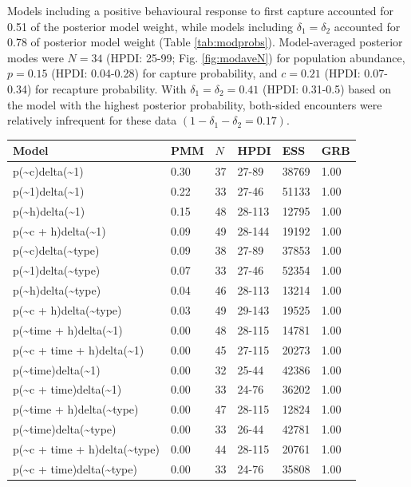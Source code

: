 \documentclass[12pt]{article}
\begin{document}
Models including a positive behavioural response to first capture accounted for 0.51 of the posterior model weight, while models including $\delta_1=\delta_2$ accounted for 0.78 of posterior model weight (Table \ref{tab:modprobs}). Model-averaged posterior modes were $N=34$ (HPDI: 25-99; Fig. \ref{fig:modaveN}) for population abundance, $p=0.15$ (HPDI: 0.04-0.28) for capture probability, and $c=0.21$ (HPDI: 0.07-0.34) for recapture probability. With $\delta_1=\delta_2=0.41$ (HPDI: 0.31-0.5) based on the model with the highest posterior probability, both-sided encounters were relatively infrequent for these data $(1-\delta_1-\delta_2=0.17)$.
\begin{table}[ht]
\centering
\begin{tabular}{llllll}
  \hline
Model & PMM & $N$ & HPDI & ESS & GRB \\ 
  \hline
p(\~{}c)delta(\~{}1) & 0.30 & 37 & 27-89 & 38769 & 1.00 \\ 
  p(\~{}1)delta(\~{}1) & 0.22 & 33 & 27-46 & 51133 & 1.00 \\ 
  p(\~{}h)delta(\~{}1) & 0.15 & 48 & 28-113 & 12795 & 1.00 \\ 
  p(\~{}c + h)delta(\~{}1) & 0.09 & 49 & 28-144 & 19192 & 1.00 \\ 
  p(\~{}c)delta(\~{}type) & 0.09 & 38 & 27-89 & 37853 & 1.00 \\ 
  p(\~{}1)delta(\~{}type) & 0.07 & 33 & 27-46 & 52354 & 1.00 \\ 
  p(\~{}h)delta(\~{}type) & 0.04 & 46 & 28-113 & 13214 & 1.00 \\ 
  p(\~{}c + h)delta(\~{}type) & 0.03 & 49 & 29-143 & 19525 & 1.00 \\ 
  p(\~{}time + h)delta(\~{}1) & 0.00 & 48 & 28-115 & 14781 & 1.00 \\ 
  p(\~{}c + time + h)delta(\~{}1) & 0.00 & 45 & 27-115 & 20273 & 1.00 \\ 
  p(\~{}time)delta(\~{}1) & 0.00 & 32 & 25-44 & 42386 & 1.00 \\ 
  p(\~{}c + time)delta(\~{}1) & 0.00 & 33 & 24-76 & 36202 & 1.00 \\ 
  p(\~{}time + h)delta(\~{}type) & 0.00 & 47 & 28-115 & 12824 & 1.00 \\ 
  p(\~{}time)delta(\~{}type) & 0.00 & 33 & 26-44 & 42781 & 1.00 \\ 
  p(\~{}c + time + h)delta(\~{}type) & 0.00 & 44 & 28-115 & 20761 & 1.00 \\ 
  p(\~{}c + time)delta(\~{}type) & 0.00 & 33 & 24-76 & 35808 & 1.00 \\ 

\end{tabular}
\end{table}
\end{document}
